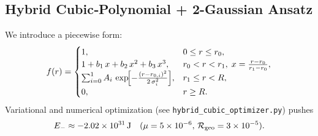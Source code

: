 \documentclass[12pt]{article}
\begin{document}
\subsection{Hybrid Cubic‐Polynomial + 2-Gaussian Ansatz}
We introduce a piecewise form:
\[
  f(r) =
  \begin{cases}
    1, & 0 \le r \le r_0,\\
    1 + b_1\,x + b_2\,x^2 + b_3\,x^3, & r_0 < r < r_1,\; x=\tfrac{r-r_0}{r_1-r_0},\\
    \sum_{i=0}^{1} A_i\,\exp\!\Bigl[-\tfrac{(r - r_{0,i})^2}{2\,\sigma_i^2}\Bigr], & r_1 \le r < R,\\
    0, & r \ge R.
  \end{cases}
\]
Variational and numerical optimization (see \texttt{hybrid_cubic_optimizer.py}) pushes
\[
  E_- \approx -2.02\times10^{31}\,\text{J}
  \quad(\mu=5\times10^{-6},\,\mathcal{R}_{\rm geo}=3\times10^{-5}).
\]
\end{document}
